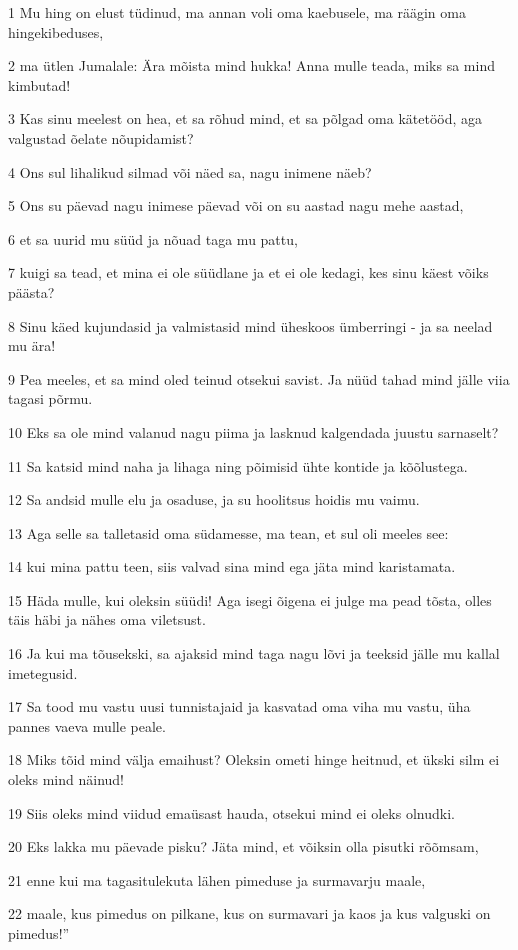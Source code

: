 \par 1 Mu hing on elust tüdinud, ma annan voli oma kaebusele, ma räägin oma hingekibeduses,
\par 2 ma ütlen Jumalale: Ära mõista mind hukka! Anna mulle teada, miks sa mind kimbutad!
\par 3 Kas sinu meelest on hea, et sa rõhud mind, et sa põlgad oma kätetööd, aga valgustad õelate nõupidamist?
\par 4 Ons sul lihalikud silmad või näed sa, nagu inimene näeb?
\par 5 Ons su päevad nagu inimese päevad või on su aastad nagu mehe aastad,
\par 6 et sa uurid mu süüd ja nõuad taga mu pattu,
\par 7 kuigi sa tead, et mina ei ole süüdlane ja et ei ole kedagi, kes sinu käest võiks päästa?
\par 8 Sinu käed kujundasid ja valmistasid mind üheskoos ümberringi - ja sa neelad mu ära!
\par 9 Pea meeles, et sa mind oled teinud otsekui savist. Ja nüüd tahad mind jälle viia tagasi põrmu.
\par 10 Eks sa ole mind valanud nagu piima ja lasknud kalgendada juustu sarnaselt?
\par 11 Sa katsid mind naha ja lihaga ning põimisid ühte kontide ja kõõlustega.
\par 12 Sa andsid mulle elu ja osaduse, ja su hoolitsus hoidis mu vaimu.
\par 13 Aga selle sa talletasid oma südamesse, ma tean, et sul oli meeles see:
\par 14 kui mina pattu teen, siis valvad sina mind ega jäta mind karistamata.
\par 15 Häda mulle, kui oleksin süüdi! Aga isegi õigena ei julge ma pead tõsta, olles täis häbi ja nähes oma viletsust.
\par 16 Ja kui ma tõusekski, sa ajaksid mind taga nagu lõvi ja teeksid jälle mu kallal imetegusid.
\par 17 Sa tood mu vastu uusi tunnistajaid ja kasvatad oma viha mu vastu, üha pannes vaeva mulle peale.
\par 18 Miks tõid mind välja emaihust? Oleksin ometi hinge heitnud, et ükski silm ei oleks mind näinud!
\par 19 Siis oleks mind viidud emaüsast hauda, otsekui mind ei oleks olnudki.
\par 20 Eks lakka mu päevade pisku? Jäta mind, et võiksin olla pisutki rõõmsam,
\par 21 enne kui ma tagasitulekuta lähen pimeduse ja surmavarju maale,
\par 22 maale, kus pimedus on pilkane, kus on surmavari ja kaos ja kus valguski on pimedus!”

